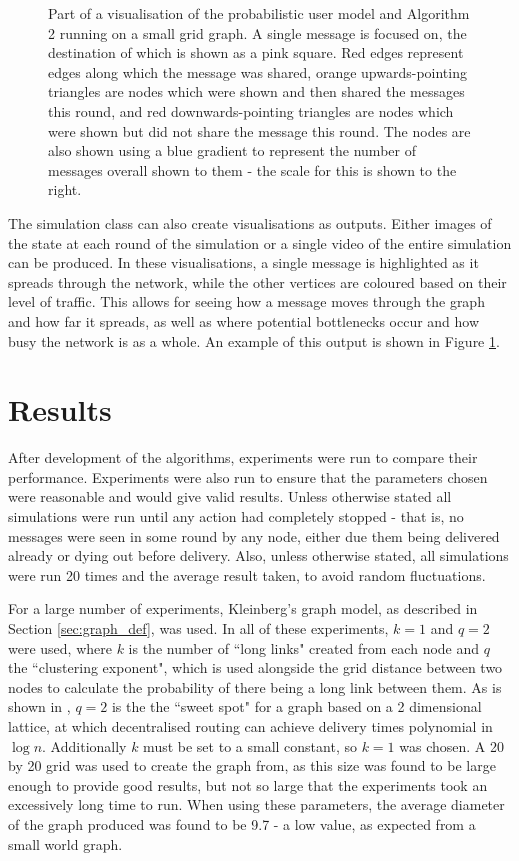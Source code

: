 \documentclass[bsc,frontabs,twoside,singlespacing,parskip,deptreport]{infthesis}     %
\begin{document}
\begin{figure}
\begin{subfigure}[]{0.47\textwidth}
\end{subfigure}
\caption{Part of a visualisation of the probabilistic user model and Algorithm 2 running on a small grid graph. A single message is focused on, the destination of which is shown as a pink square. Red edges represent edges along which the message was shared, orange upwards-pointing triangles are nodes which were shown and then shared the messages this round, and red downwards-pointing triangles are nodes which were shown but did not share the message this round. The nodes are also shown using a blue gradient to represent the number of messages overall shown to them - the scale for this is shown to the right.}
\label{fig:visualisation}
\end{figure}

The simulation class can also create visualisations as outputs. Either images of the state at each round of the simulation or a single video of the entire simulation can be produced. In these visualisations, a single message is highlighted as it spreads through the network, while the other vertices are coloured based on their level of traffic. This allows for seeing how a message moves through the graph and how far it spreads, as well as where potential bottlenecks occur and how busy the network is as a whole. An example of this output is shown in Figure \ref{fig:visualisation}.


\chapter{Results} \label{chapter4}
After development of the algorithms, experiments were run to compare their performance. Experiments were also run to ensure that the parameters chosen were reasonable and would give valid results. Unless otherwise stated all simulations were run until any action had completely stopped - that is, no messages were seen in some round by any node, either due them being delivered already or dying out before delivery. Also, unless otherwise stated, all simulations were run 20 times and the average result taken, to avoid random fluctuations.

For a large number of experiments, Kleinberg's graph model, as described in Section \ref{sec:graph_def}, was used. In all of these experiments, $k=1$ and $q=2$ were used, where $k$ is the number of ``long links" created from each node and $q$ the ``clustering exponent", which is used alongside the grid distance between two nodes to calculate the probability of there being a long link between them. As is shown in \cite{Kleinberg00},  $q=2$ is the the ``sweet spot" for a graph based on a 2 dimensional lattice, at which decentralised routing can achieve delivery times polynomial in $\log n$. Additionally $k$ must be set to a small constant, so $k=1$ was chosen. A 20 by 20 grid was used to create the graph from, as this size was found to be large enough to provide good results, but not so large that the experiments took an excessively long time to run. When using these parameters, the average diameter of the graph produced was found to be 9.7 - a low value, as expected from a small world graph.
\end{document}
